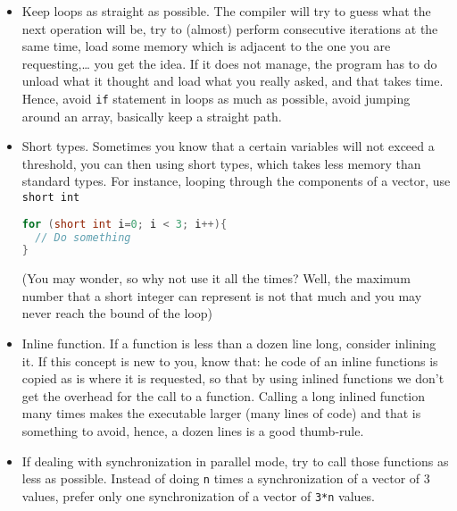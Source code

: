 \documentclass[a4paper,12pt,%
              final%
              ]{article}
\begin{document}
\begin{itemize}
      \item Keep loops as straight as possible. The compiler will try to guess what the next operation will be, try to (almost) perform consecutive iterations at the same time, load some memory which is adjacent to the one you are requesting,\ldots{} you get the idea. If it does not manage, the program has to do unload what it thought and load what you really asked, and that takes time. Hence, avoid \texttt{if} statement in loops as much as possible, avoid jumping around an array, basically keep a straight path.
      \item Short types. Sometimes you know that a certain variables will not exceed a threshold, you can then using short types, which takes less memory than standard types. For instance, looping through the components of a vector, use \texttt{short int}
\begin{lstlisting}[language=C]
for (short int i=0; i < 3; i++){
  // Do something
}
\end{lstlisting}
        (You may wonder, so why not use it all the times? Well, the maximum number that a short integer can represent is not that much and you may never reach the bound of the loop)
      \item Inline function. If a function is less than a dozen line long, consider inlining it. If this concept is new to you, know that: he code of an inline functions is copied as is where it is requested, so that by using inlined functions we don't get the overhead for the call to a function. Calling a long inlined function many times makes the executable larger (many lines of code) and that is something to avoid, hence, a dozen lines is a good thumb-rule.
      \item If dealing with synchronization in parallel mode, try to call those functions as less as possible. Instead of doing \texttt{n} times a synchronization of a vector of 3 values, prefer only one synchronization of a vector of \texttt{3*n} values.
    \end{itemize}

\end{document}
